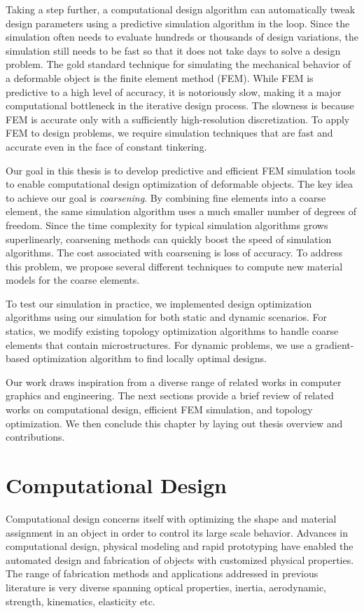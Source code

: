 Taking a step further, a computational design algorithm can automatically tweak design parameters using a predictive simulation algorithm in the loop.
Since the simulation often needs to evaluate hundreds or thousands of design variations, the simulation still needs to be fast so that it does not take days to solve a design problem.
The gold standard technique for simulating the mechanical behavior of a deformable object is the finite element method (FEM).
While FEM is predictive to a high level of accuracy, it is notoriously slow, making it a major computational bottleneck in the iterative design process.
The slowness is because FEM is accurate only with a sufficiently high-resolution discretization.
To apply FEM to design problems, we require simulation techniques that are fast and accurate even in the face of constant tinkering.

Our goal in this thesis is to develop predictive and efficient FEM simulation tools to enable computational design optimization of deformable objects.
The key idea to achieve our goal is \textit{coarsening}.
By combining fine elements into a coarse element, the same simulation algorithm uses a much smaller number of degrees of freedom.
Since the time complexity for typical simulation algorithms grows superlinearly,
coarsening methods can quickly boost the speed of simulation algorithms.
The cost associated with coarsening is loss of accuracy.
To address this problem, we propose several different techniques to compute new material models for the coarse elements.

To test our simulation in practice, we implemented design optimization algorithms using our simulation for both static and dynamic scenarios.
For statics, we modify existing topology optimization algorithms to handle coarse elements that contain microstructures.
For dynamic problems, we use a gradient-based optimization algorithm to find locally optimal designs.

Our work draws inspiration from a diverse range of related works in computer graphics and engineering.
The next sections provide a brief review of related works on computational design, efficient FEM simulation, and topology optimization.
We then conclude this chapter by laying out thesis overview and contributions.

\section{Computational Design}
Computational design concerns itself with optimizing the shape and material assignment in an object in order to control its large scale behavior.
Advances in computational design, physical modeling and rapid prototyping 
have enabled the automated design and fabrication of objects with customized physical properties.
The range of fabrication methods and applications addressed in previous literature is very diverse spanning optical properties, inertia, aerodynamic, strength, kinematics, elasticity etc.

